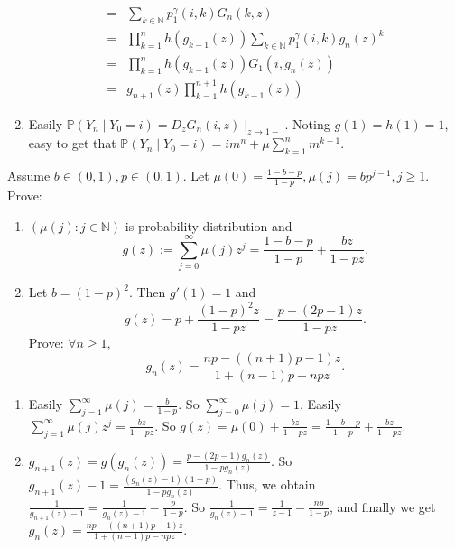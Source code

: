 \documentclass[../main]{subfiles}
\begin{document}
\begin{solution}
\begin{enumerate}
\[\begin{aligned}
          = & \sum_{k \in \mathbb{N}}p_1^\gamma(i,k)G_n(k,z)                                                    \\
          = & \prod_{k=1}^{n} h(g_{k-1} (z))\sum_{k \in \mathbb{N}}p_1^\gamma(i,k) g_n(z)^k                     \\
          = & \prod_{k=1}^{n} h(g_{k-1} (z)) G_1(i,g_n(z))                                                      \\
          = & g_{n+1}(z)\prod_{k=1}^{n + 1} h(g_{k-1} (z))
        \end{aligned}
      \]
    \item Easily \(\mathbb{P}(Y_n \mid Y_0=i)=D_z G_{n}(i,z) \mid_{z \to 1-}\).
      Noting \(g(1)=h(1)=1\), easy to get that \(\mathbb{P}(Y_n \mid Y_0=i)=im^n + \mu \sum_{k=1}^{n} m^{k-1}\).
  \end{enumerate}

\end{solution}

\begin{problem}\label{pro:2}
  Assume \(b \in (0,1), p \in (0,1)\). Let \(\mu(0)=\frac{1-b-p}{1-p},\mu(j)=bp^{j-1},j \geq 1\).
  Prove:
  \begin{enumerate}
    \item   \((\mu(j):j \in \mathbb{N})\) is probability distribution and \[
        g(z):=\sum_{j=0}^{\infty} \mu(j)z^j=\frac{1-b-p}{1-p} + \frac{bz}{1-pz}.
      \]

    \item Let \(b =(1-p)^2\).
      Then  \(g'(1)=1\) and \[
        g(z)=p + \frac{(1-p)^2 z}{1-pz}=\frac{p-(2p-1)z}{1-pz}.
      \]
      Prove:
      \(\forall n \geq 1\), \[
        g_n(z)=\frac{np-((n + 1)p-1)z}{1 + (n-1)p-npz}.
      \]
  \end{enumerate}
\end{problem}
\begin{solution}
  \begin{enumerate}
    \item Easily \(\sum_{j=1}^{\infty} \mu(j)=\frac{b}{1-p}\).
      So \(\sum_{j=0}^{\infty} \mu(j)=1\).
      Easily \(\sum_{j=1}^{\infty} \mu(j)z^j=\frac{bz}{1-pz}\).
      So \(g(z)=\mu(0)+\frac{bz}{1-pz}=\frac{1-b-p}{1-p} + \frac{bz}{1-pz}\).
    \item \(g_{n+1}(z)=g(g_n(z))=\frac{p-(2p-1)g_n(z)}{1-pg_n(z)}\).
      So \(g_{n+1}(z)-1=\frac{(g_n(z)-1)(1-p)}{1-p g_n(z)}\).
      Thus, we obtain \(\frac{1}{g_{n+1}(z)-1}=\frac{1}{g_n(z)-1}-\frac{p}{1-p}\).
      So \(\frac{1}{g_n(z)-1}=\frac{1}{z-1}-\frac{np}{1-p}\), and finally we get
      \( g_n(z)=\frac{np-((n + 1)p-1)z}{1 + (n-1)p-npz} \).
  \end{enumerate}

\end{solution}
\end{document}
